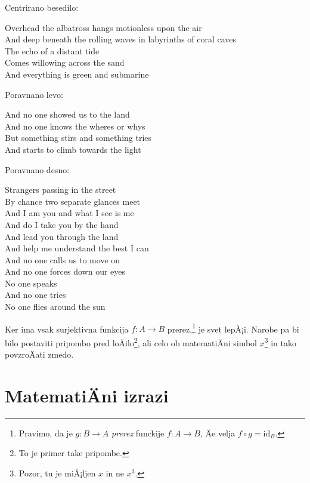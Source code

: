 \documentclass[a4paper]{article}
\begin{document}
\noindent
Centrirano besedilo:
%
\begin{center}
Overhead the albatross hangs motionless upon the air\\
And deep beneath the rolling waves in labyrinths of coral caves\\
The echo of a distant tide\\
Comes willowing across the sand\\
And everything is green and submarine
\end{center}

\noindent
Poravnano levo:
%
\begin{flushleft}
And no one showed us to the land\\
And no one knows the wheres or whys\\
But something stirs and something tries\\
And starts to climb towards the light
\end{flushleft}

\noindent
Poravnano desno:
%
\begin{flushright}
Strangers passing in the street\\
By chance two separate glances meet\\
And I am you and what I see is me\\
And do I take you by the hand\\
And lead you through the land\\
And help me understand the best I can\\
And no one calls us to move on\\
And no one forces down our eyes\\
No one speaks\\
And no one tries\\
No one flies around the sun
\end{flushright}

Ker ima vsak surjektivna funkcija $f : A \to B$ prerez,\footnote{Pravimo, da je
  $g : B \to A$ \emph{prerez} funckije $f : A \to B$, Äe velja
  $f \circ g = \mathrm{id}_B$.} je svet lepÅ¡i. Narobe pa bi bilo postaviti pripombo pred
loÄilo\footnote{To je primer take pripombe.}, ali celo ob matematiÄni simbol
$x$\footnote{Pozor, tu je miÅ¡ljen $x$ in ne $x^3$.} in tako povzroÄati zmedo.

\section{MatematiÄni izrazi}
\end{document}
